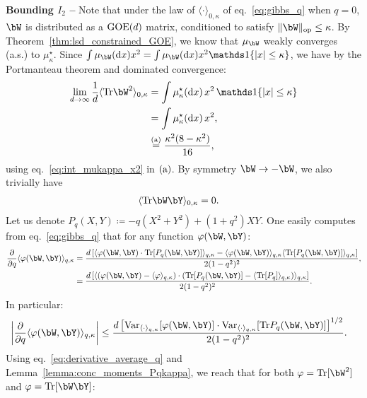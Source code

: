 \myskip 
\textbf{Bounding $I_2$ --}
Note that under the law of $\langle \cdot \rangle_{0,\kappa}$ of eq.~\eqref{eq:gibbs_q} when $q = 0$,
$\bW$ is distributed as a $\mathrm{GOE}(d)$ matrix, conditioned to satisfy $\|\bW\|_\op \leq \kappa$.
By Theorem~\ref{thm:lsd_constrained_GOE}, we know that $\mu_\bW$ weakly converges (a.s.) to $\mu_\kappa^\star$.
Since $\int \mu_\bW(\rd x) x^2 = \int \mu_\bW(\rd x) x^2 \indi\{|x| \leq \kappa\}$, we have by the Portmanteau theorem 
and dominated convergence: 
\begin{align}
    \label{eq:limit_TrW2_q0}
    \nonumber
    \lim_{d \to \infty} \frac{1}{d}\langle\Tr \bW^2\rangle_{0, \kappa} &= \int \mu_\kappa^\star(\rd x) \, x^2 \, \indi\{|x| \leq \kappa\} \\ 
    &= \int \mu_\kappa^\star(\rd x) \, x^2, \\
    &\aeq \frac{\kappa^2 (8-\kappa^2)}{16},
\end{align}
using eq.~\eqref{eq:int_mukappa_x2} in $(\rm a)$.
By symmetry $\bW \to -\bW$, we also trivially have
\begin{align}
    \label{eq:limit_TrWY_q0}
    \langle\Tr \bW \bY\rangle_{0, \kappa} &= 0.
\end{align}
Let us denote $P_q(X, Y) \coloneqq - q (X^2 + Y^2) + (1+q^2) X Y$. 
One easily computes from eq.~\eqref{eq:gibbs_q} that 
for any function $\varphi(\bW, \bY)$: 
\begin{align*}
    \frac{\partial}{\partial q}\langle \varphi(\bW, \bY)\rangle_{q,\kappa} 
    &= \frac{d \left[\langle \varphi(\bW, \bY) \cdot \Tr[P_q(\bW, \bY)] \rangle_{q, \kappa} - \langle \varphi(\bW, \bY) \rangle_{q, \kappa} \langle \Tr[P_q(\bW, \bY)] \rangle_{q, \kappa}\right]}{2(1-q^2)^2}, \\ 
    &= \frac{d \left[\langle \left(\varphi(\bW, \bY) - \langle \varphi \rangle_{q, \kappa}\right) \cdot \left(\Tr[P_q(\bW, \bY)] - \langle \Tr[P_q]\rangle_{q, \kappa}\right) \rangle_{q, \kappa}\right]}{2(1-q^2)^2}.
\end{align*}
In particular:
\begin{align}\label{eq:derivative_average_q}
    \left|\frac{\partial}{\partial q}\langle \varphi(\bW, \bY)\rangle_{q,\kappa}\right| 
    &\leq \frac{d \left[\Var_{\langle \cdot \rangle_{q, \kappa}}[\varphi(\bW, \bY)] \cdot \Var_{\langle \cdot \rangle_{q, \kappa}}[\Tr P_q(\bW, \bY)]\right]^{1/2}}{2(1-q^2)^2}.
\end{align}
Using eq.~\eqref{eq:derivative_average_q} and Lemma~\ref{lemma:conc_moments_Pqkappa}, 
we reach that for both $\varphi = \Tr[\bW^2]$ and $\varphi = \Tr[\bW \bY]$: 
